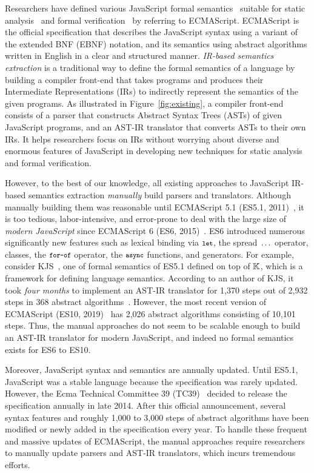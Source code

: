 Researchers have defined various JavaScript formal
semantics~\cite{aplas08,lambdajs,kjs,javert} suitable for static
analysis~\cite{jsai,tajs,wala,safe} and formal verification~\cite{javert} by
referring to ECMAScript.  ECMAScript is the official specification that
describes the JavaScript syntax using a variant of the extended BNF (EBNF) notation,
and its semantics using abstract algorithms written in English in a clear and
structured manner.  \textit{IR-based semantics extraction} is a traditional way to
define the formal semantics of a language by building a compiler front-end
that takes programs and produces their Intermediate
Representations (IRs) to indirectly represent the semantics of the given programs.
As illustrated in Figure~\ref{fig:existing}, a compiler front-end consists of a parser
that constructs Abstract Syntax Trees (ASTs) of given JavaScript programs, and
an AST-IR translator that converts ASTs to their own IRs.  It helps
researchers focus on IRs without worrying about diverse and enormous features of
JavaScript in developing new techniques for static analysis and formal
verification.

However, to the best of our knowledge, all existing approaches to JavaScript
IR-based semantics extraction \textit{manually} build parsers and translators.
Although manually building them was reasonable until ECMAScript 5.1 (ES5.1,
2011)~\cite{es5}, it is too tedious, labor-intensive, and
error-prone to deal with the large size of \textit{modern JavaScript} since ECMAScript 6
(ES6, 2015)~\cite{es6}. ES6 introduced numerous significantly new features such
as lexical binding via \( \texttt{\footnotesize let} \), the spread \( \texttt{\footnotesize...} \) operator,
classes, the \( \texttt{\footnotesize for-of} \) operator, the \( \texttt{\footnotesize async} \) functions, and
generators.  For example, consider KJS~\cite{kjs},
one of formal semantics of ES5.1 defined on top of \( \mathbb{K} \), which is
a framework for defining language semantics.
According to an author of KJS, it took
\textit{four months} to implement an AST-IR translator for 1,370 steps out of 2,932
steps in 368 abstract algorithms~\cite{kjsslides}. However, the most recent version of ECMAScript
(ES10, 2019)~\cite{es10} has 2,026 abstract algorithms consisting of 10,101
steps. Thus, the manual approaches do not seem to be scalable enough to build
an AST-IR translator for modern JavaScript,
and indeed no formal semantics exists for ES6 to ES10.

Moreover, JavaScript syntax and semantics are annually updated.  Until
ES5.1, JavaScript was a stable language because the specification was
rarely updated.  However, the Ecma Technical Committee 39 (TC39)~\cite{tc39}
decided to release the specification annually in late 2014.  After this official
announcement, several syntax features and roughly 1,000 to 3,000 steps of
abstract algorithms have been modified or newly added in the specification every year.
To handle these frequent and massive updates of ECMAScript,
the manual approaches require researchers to manually update parsers and AST-IR translators,
which incurs tremendous efforts.

